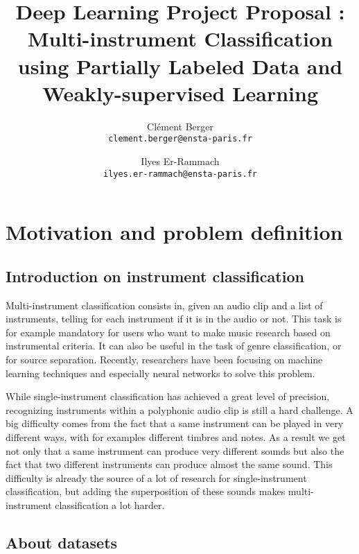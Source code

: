 \documentclass[final]{cvpr}
\begin{document}
\title{Deep Learning Project Proposal : Multi-instrument Classification using Partially Labeled Data and Weakly-supervised Learning}

\author{
	Clément Berger\\
	{\tt\small clement.berger@ensta-paris.fr}
\and Ilyes Er-Rammach\\
{\tt\small ilyes.er-rammach@ensta-paris.fr}

}

\maketitle
\section{Motivation and problem definition}
\subsection{Introduction on instrument classification}
Multi-instrument classification consists in, given an audio clip and a list of instruments, telling for each instrument if it is in the audio or not. This task is for example mandatory for users who want to make music research based on instrumental criteria. It can also be useful in the task of genre classification, or for source separation. Recently, researchers have been focusing on machine learning techniques and especially neural networks to solve this problem.

While single-instrument classification has achieved a great level of precision, recognizing instruments within a polyphonic audio clip is still a hard challenge. A big difficulty comes from the fact that a same instrument can be played in very different ways, with for examples different timbres and notes. As a result we get not only that a same instrument can produce very different sounds but also the fact that two different instruments can produce almost the same sound. This difficulty is already the source of a lot of research for single-instrument classification, but adding the superposition of these sounds makes multi-instrument classification a lot harder.

\subsection{About datasets}
\end{document}
